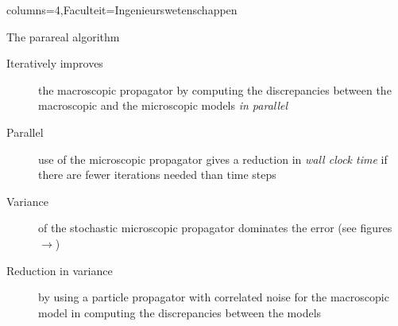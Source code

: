 \documentclass[landscape,a0paper,fontscale=0.45]{kuleuvenposter}
\begin{document}
\begin{poster}{columns=4,Faculteit=Ingenieurswetenschappen}
\begin{posterbox}%
[name=parareal micro-macro, column=1, above=bottom, boxColorOne=KULeuvenFaculteit!15!white, borderColor=KULeuvenFaculteit]%
{The parareal algorithm}
\begin{description}
\item[Iteratively improves] the macroscopic propagator by computing the discrepancies between the {\color{KULeuvenBlauw}macroscopic} and the {\color{KULeuvenFaculteit}microscopic} models \emph{in parallel}
\item[Parallel] use of the microscopic propagator gives a reduction in \emph{wall clock time} if there are fewer iterations needed than time steps
\item[Variance] of the stochastic microscopic propagator dominates the error (see figures $\rightarrow$)%
\item[Reduction in variance] by using a particle propagator with {\color{KULeuvenSecundair}correlated noise} for the macroscopic model in computing the discrepancies between the models
\end{description}

\end{posterbox}


\end{poster}
\end{document}

